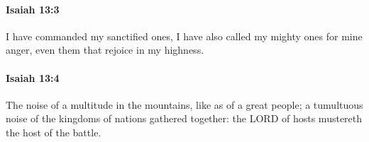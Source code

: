 		\paragraph{Isaiah 13:3} %
			\label{ISAIAH-13-3}

			I have commanded my sanctified ones, I have also called my mighty ones for mine anger, even them that rejoice in my highness.


		\paragraph{Isaiah 13:4} %
			\label{ISAIAH-13-4}

			The noise of a multitude in the mountains, like as of a great people; a tumultuous noise of the kingdoms of nations gathered together: the LORD of hosts mustereth the host of the battle.


